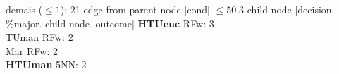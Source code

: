 {{{{%
demais ($\leq 1$): 21} edge from parent node [cond] {$\leq50.3$}}
child {node [decision] {\%major.}
child {node [outcome] {
\textbf{HTUeuc} RFw: 3\\
TUman RFw: 2\\
Mar RFw: 2\\
\textbf{HTUman} 5NN: 2\\
}}}}}
